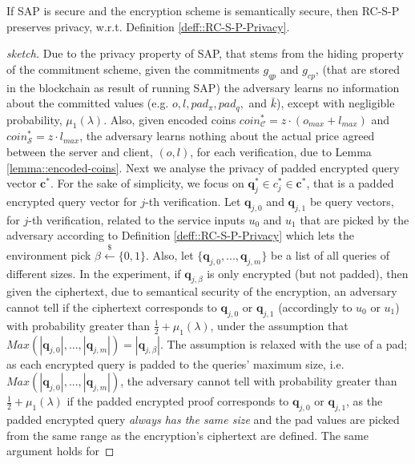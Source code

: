 \begin{lemma} If SAP is secure and the encryption scheme is semantically secure, then RC-S-P preserves privacy, w.r.t. Definition \ref{deff::RC-S-P-Privacy}. 
\end{lemma}

\begin{proof}[sketch]
Due to the privacy property of SAP, that stems from the  hiding property of the commitment scheme, given the commitments $g_{\scriptscriptstyle qp}$ and $g_{\scriptscriptstyle cp}$, (that are stored in the blockchain as result of running SAP) the adversary learns no information about the committed values (e.g. $o, l, pad_{\scriptscriptstyle\pi}, pad_{\scriptscriptstyle q},$ and $\bar{k}$), except with negligible probability, $\mu_{\scriptscriptstyle 1}(\lambda)$.   Also, given encoded coins $coin^{\scriptscriptstyle *}_{\scriptscriptstyle\mathcal{C}}=z\cdot (o_{\scriptscriptstyle max}+l_{\scriptscriptstyle max})$ and  $coin^{\scriptscriptstyle *}_{\scriptscriptstyle\mathcal{S}}=z\cdot l_{\scriptscriptstyle max}$, the adversary learns nothing about the actual price agreed between the server and client,  $(o,l)$, for each verification, due to Lemma \ref{lemma::encoded-coins}. Next we analyse the privacy of padded encrypted query vector $\bm{c}^{\scriptscriptstyle *}$. For  the sake of simplicity, we focus on   $\bm{q}^{\scriptscriptstyle *}_{\scriptscriptstyle j}\in c^{\scriptscriptstyle *}_{\scriptscriptstyle j}\in\bm{c}^{\scriptscriptstyle *}$, that is a padded encrypted query vector for $j$-th verification. Let $\bm{q}_{\scriptscriptstyle j,0}$ and $\bm{q}_{\scriptscriptstyle j,1}$  be query vectors, for $j$-th verification, related to the service inputs $u_{\scriptscriptstyle 0}$ and $u_{\scriptscriptstyle 1}$ that    are picked by the adversary according to  Definition  \ref{deff::RC-S-P-Privacy} which lets  the environment pick $\beta\stackrel{\scriptscriptstyle\$}\leftarrow \{0,1\}$. Also, let $\{\bm{q}_{\scriptscriptstyle j,0},...,\bm{q}_{\scriptscriptstyle j,m}\}$ be a  list of all queries of different sizes. In the experiment, if $\bm{q}_{\scriptscriptstyle j,\beta}$  is only   encrypted (but not padded), then given the ciphertext, due to semantical security of the encryption, an adversary cannot tell if the ciphertext corresponds to $\bm{q}_{\scriptscriptstyle j,0}$ or $\bm{q}_{\scriptscriptstyle j,1}$  (accordingly to $u_{\scriptscriptstyle 0}$ or $u_{\scriptscriptstyle 1}$) with probability greater than $\frac{1}{2}+\mu_{\scriptscriptstyle 1}(\lambda)$,  under the assumption  that $Max(|\bm{q}_{\scriptscriptstyle j,0}|,...,|\bm{q}_{\scriptscriptstyle j,m}|)=|\bm{q}_{\scriptscriptstyle j,\beta}|$. The  assumption is  relaxed with the use of a pad; as each encrypted query is padded  to the queries' maximum size, i.e. $Max(|\bm{q}_{\scriptscriptstyle j,0}|,...,|\bm{q}_{\scriptscriptstyle j,m}|)$, the adversary cannot tell with probability greater than $\frac{1}{2}+\mu_{\scriptscriptstyle 1}(\lambda)$ if the  padded encrypted proof corresponds to  $\bm{q}_{\scriptscriptstyle j,0}$ or $\bm{q}_{\scriptscriptstyle j,1}$, as the padded encrypted query \emph{always has the same size} and the pad values are picked from the same range as the encryption's ciphertext are defined. The same argument holds for 
\end{proof}
